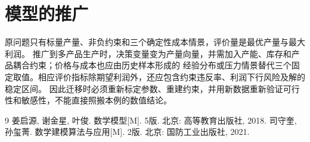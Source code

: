 \documentclass[11pt]{article}
\begin{document}
\section{模型的推广}
原问题只有标量产量、非负约束和三个确定性成本情景，评价量是最优产量与最大利润。
推广到多产品生产时，决策变量变为产量向量，并需加入产能、库存和产品耦合约束；价格与成本也应由历史样本形成的
经验分布或压力情景替代三个固定取值。相应评价指标除期望利润外，还应包含约束违反率、利润下行风险及解的稳定区间。
因此迁移时必须重新标定参数、重建约束，并用新数据重新验证可行性和敏感性，不能直接照搬本例的数值结论。

\clearpage
\begin{thebibliography}{9}
 姜启源, 谢金星, 叶俊. 数学模型[M]. 5版. 北京: 高等教育出版社, 2018.
 司守奎, 孙玺菁. 数学建模算法与应用[M]. 2版. 北京: 国防工业出版社, 2021.
\end{thebibliography}
\end{document}
